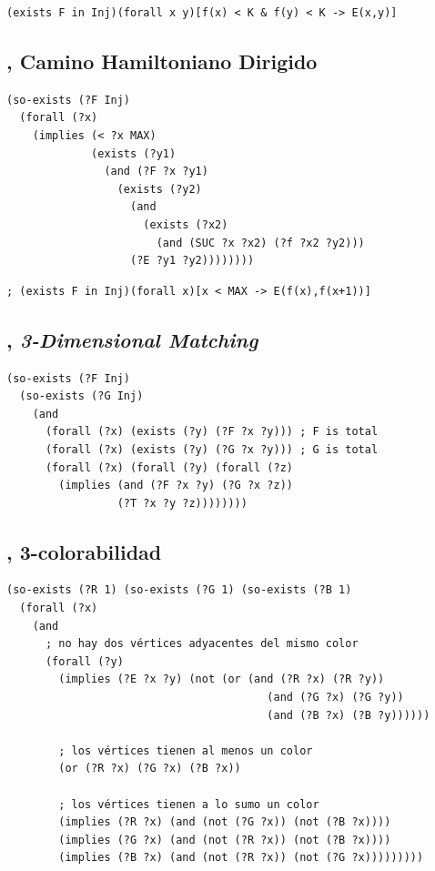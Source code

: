 \begin{verbatim}
(exists F in Inj)(forall x y)[f(x) < K & f(y) < K -> E(x,y)]
\end{verbatim}

\subsection{\CHD, Camino Hamiltoniano Dirigido}
\begin{verbatim}
(so-exists (?F Inj)
  (forall (?x)
    (implies (< ?x MAX)
             (exists (?y1)
               (and (?F ?x ?y1)
                 (exists (?y2)
                   (and
                     (exists (?x2) 
                       (and (SUC ?x ?x2) (?f ?x2 ?y2)))
                   (?E ?y1 ?y2))))))))
\end{verbatim}
\begin{verbatim}
; (exists F in Inj)(forall x)[x < MAX -> E(f(x),f(x+1))]
\end{verbatim}

\subsection{\TDM, \textit{3-Dimensional Matching}}
\begin{verbatim}
(so-exists (?F Inj)
  (so-exists (?G Inj)
    (and
      (forall (?x) (exists (?y) (?F ?x ?y))) ; F is total
      (forall (?x) (exists (?y) (?G ?x ?y))) ; G is total
      (forall (?x) (forall (?y) (forall (?z)
        (implies (and (?F ?x ?y) (?G ?x ?z))
                 (?T ?x ?y ?z))))))))
\end{verbatim}

\subsection{\TCOL, 3-colorabilidad}
\begin{verbatim}
(so-exists (?R 1) (so-exists (?G 1) (so-exists (?B 1)
  (forall (?x) 
    (and
      ; no hay dos vértices adyacentes del mismo color
      (forall (?y)
        (implies (?E ?x ?y) (not (or (and (?R ?x) (?R ?y))
                                        (and (?G ?x) (?G ?y))
                                        (and (?B ?x) (?B ?y))))))

        ; los vértices tienen al menos un color
        (or (?R ?x) (?G ?x) (?B ?x))

        ; los vértices tienen a lo sumo un color
        (implies (?R ?x) (and (not (?G ?x)) (not (?B ?x))))
        (implies (?G ?x) (and (not (?R ?x)) (not (?B ?x))))
        (implies (?B ?x) (and (not (?R ?x)) (not (?G ?x)))))))))
\end{verbatim}


